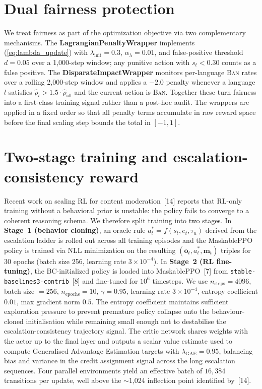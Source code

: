 \documentclass{article}
\begin{document}
\section{Dual fairness protection}
\label{sec:fairness}

We treat fairness as part of the optimization objective via two complementary
mechanisms. The \textbf{LagrangianPenaltyWrapper} implements
(\ref{eq:lambda_update}) with $\lambda_{\text{init}} = 0.3$,
$\alpha_\lambda = 0.01$, and false-positive threshold $d = 0.05$ over a
1{,}000-step window; any punitive action with $s_t < 0.30$ counts as a false
positive. The \textbf{DisparateImpactWrapper} monitors per-language \textsc{Ban}
rates over a rolling 2{,}000-step window and applies a $-2.0$ penalty whenever a
language $l$ satisfies $\hat{\rho}_l > 1.5 \cdot \hat{\rho}_{\text{all}}$ and the
current action is \textsc{Ban}. Together these turn fairness into a first-class
training signal rather than a post-hoc audit. The wrappers are applied in a
fixed order so that all penalty terms accumulate in raw reward space before the
final scaling step bounds the total in $[-1,1]$.


\section{Two-stage training and escalation-consistency reward}
\label{sec:training}

Recent work on scaling RL for content moderation~[14] reports that RL-only
training without a behavioral prior is unstable: the policy fails to converge
to a coherent reasoning schema. We therefore split training into two stages.
In \textbf{Stage~1 (behavior cloning)}, an oracle rule
$a^*_t = f(s_t, e_t, \tau_u)$ derived from the escalation ladder is rolled out
across all training episodes and the MaskablePPO policy is trained via NLL
minimization on the resulting $(\mathbf{o}_t, a^*_t, \mathbf{m}_t)$ triples
for 30 epochs (batch size 256, learning rate $3 \times 10^{-4}$). In
\textbf{Stage~2 (RL fine-tuning)}, the BC-initialized policy is loaded into
MaskablePPO~[7] from \texttt{stable-baselines3-contrib}~[8] and fine-tuned for
$10^6$ timesteps. We use $n_{\text{steps}} = 4096$, batch size $= 256$,
$n_{\text{epochs}} = 10$, $\gamma = 0.95$, learning rate $3 \times 10^{-4}$,
entropy coefficient $0.01$, max gradient norm $0.5$. The entropy coefficient
maintains sufficient exploration pressure to prevent premature policy collapse
onto the behaviour-cloned initialisation while remaining small enough not to
destabilise the escalation-consistency trajectory signal. The critic network
shares weights with the actor up to the final layer and outputs a scalar value
estimate used to compute Generalised Advantage Estimation targets with
$\lambda_{\text{GAE}} = 0.95$, balancing bias and variance in the credit
assignment signal across the long escalation sequences. Four parallel
environments yield an effective batch of $16{,}384$ transitions per update, well
above the $\sim$1{,}024 inflection point identified by~[14].
\end{document}
